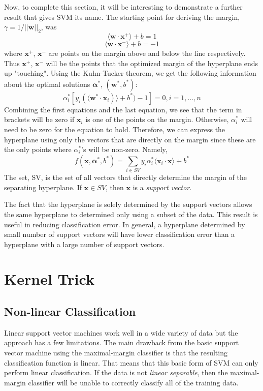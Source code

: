 \documentclass{article}
\newcommand{\bw}{\mathbf{w}}
\newcommand{\balpha}{\bm{\alpha}}
\begin{document}
Now, to complete this section, it will be interesting to demonstrate a further result that gives SVM its name. The starting point for deriving the margin, $\gamma = 1/||\bw||_2$, was 
$$ \langle \bw \cdot \mathbf{x}^+ \rangle + b = 1$$
$$ \langle \bw \cdot \mathbf{x}^- \rangle + b = -1$$
where $\mathbf{x}^+$, $\mathbf{x}^-$ are points on the margin above and below the line respectively. Thus $\mathbf{x}^+$, $\mathbf{x}^-$ will be the points that the optimized margin of the hyperplane ends up "touching". Using the Kuhn-Tucker theorem, we get the following information about the optimal solutions $\balpha^*$, $(\bw^*, b^*)$:
$$ \alpha_i^* \left[ y_i(\langle \bw^* \cdot \mathbf{x}_i) \rangle + b^*)-1  \right] = 0, i=1,\dots,n$$
Combining the first equations and the last equation, we see that the term in brackets will be zero if $\mathbf{x}_i$ is one of the points on the margin. Otherwise, $\alpha_i^*$ will need to be zero for the equation to hold. Therefore, we can express the hyperplane using only the vectors that are directly on the margin since these are the only points where $\alpha_i^*$'s will be non-zero. Namely,
$$ f(\mathbf{x}, \balpha^*, b^*) = \sum_{i \in SV} y_i \alpha_i^* \langle \mathbf{x}_i \cdot \mathbf{x} \rangle + b^*$$
The set, SV, is the set of all vectors that directly determine the margin of the separating hyperplane. If $\mathbf{x} \in SV$, then $\mathbf{x}$ is a \textit{support vector}.

The fact that the hyperplane is solely determined by the support vectors allows the same hyperplane to determined only using a subset of the data. This result is useful in reducing classification error. In general, a hyperplane determined by small number of support vectors will have lower classification error than a hyperplane with a large number of support vectors.

\section{Kernel Trick}

\subsection{Non-linear Classification}
Linear support vector machines work well in a wide variety of data but the approach has a few limitations. The main drawback from the basic support vector machine using the maximal-margin classifier is that the resulting classification function is linear. That means that this basic form of SVM can only perform linear classification. If the data is not \textit{linear separable}, then the maximal-margin classifier will be unable to correctly classify all of the training data. 
\end{document}

